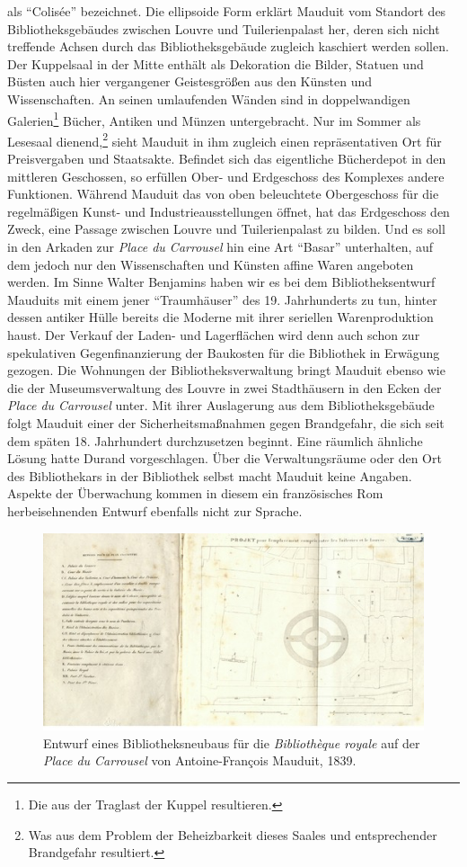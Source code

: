als \enquote{Colisée} bezeichnet. Die ellipsoide Form erklärt Mauduit
vom Standort des Bibliotheksgebäudes zwischen Louvre und Tuilerienpalast
her, deren sich nicht treffende Achsen durch das Bibliotheksgebäude
zugleich kaschiert werden sollen. Der Kuppelsaal in der Mitte enthält
als Dekoration die Bilder, Statuen und Büsten auch hier vergangener
Geistesgrößen aus den Künsten und Wissenschaften. An seinen umlaufenden
Wänden sind in doppelwandigen Galerien\footnote{Die aus der Traglast der
  Kuppel resultieren.} Bücher, Antiken und Münzen untergebracht. Nur im
Sommer als Lesesaal dienend,\footnote{Was aus dem Problem der
  Beheizbarkeit dieses Saales und entsprechender Brandgefahr resultiert.}
sieht Mauduit in ihm zugleich einen repräsentativen Ort für
Preisvergaben und Staatsakte. Befindet sich das eigentliche Bücherdepot
in den mittleren Geschossen, so erfüllen Ober- und Erdgeschoss des
Komplexes andere Funktionen. Während Mauduit das von oben beleuchtete
Obergeschoss für die regelmäßigen Kunst- und Industrieausstellungen
öffnet, hat das Erdgeschoss den Zweck, eine Passage zwischen Louvre und
Tuilerienpalast zu bilden. Und es soll in den Arkaden zur \emph{Place du
Carrousel} hin eine Art \enquote{Basar} unterhalten, auf dem jedoch nur
den Wissenschaften und Künsten affine Waren angeboten werden. Im Sinne
Walter Benjamins haben wir es bei dem Bibliotheksentwurf Mauduits mit
einem jener \enquote{Traumhäuser} des 19. Jahrhunderts zu tun, hinter
dessen antiker Hülle bereits die Moderne mit ihrer seriellen
Warenproduktion haust. Der Verkauf der Laden- und Lagerflächen wird denn
auch schon zur spekulativen Gegenfinanzierung der Baukosten für die
Bibliothek in Erwägung gezogen. Die Wohnungen der Bibliotheksverwaltung
bringt Mauduit ebenso wie die der Museumsverwaltung des Louvre in zwei
Stadthäusern in den Ecken der \emph{Place du Carrousel} unter. Mit ihrer
Auslagerung aus dem Bibliotheksgebäude folgt Mauduit einer der
Sicherheitsmaßnahmen gegen Brandgefahr, die sich seit dem späten 18.
Jahrhundert durchzusetzen beginnt. Eine räumlich ähnliche Lösung hatte
Durand vorgeschlagen. Über die Verwaltungsräume oder den Ort des
Bibliothekars in der Bibliothek selbst macht Mauduit keine Angaben.
Aspekte der Überwachung kommen in diesem ein französisches Rom
herbeisehnenden Entwurf ebenfalls nicht zur Sprache.

\begin{figure}[htbp]
\centering
\includegraphics{img/wagner-10.jpg}
\caption{Entwurf eines Bibliotheksneubaus für die
\emph{Bibliothèque royale} auf der \emph{Place du Carrousel} von
Antoine-François Mauduit, 1839.}
\end{figure}


